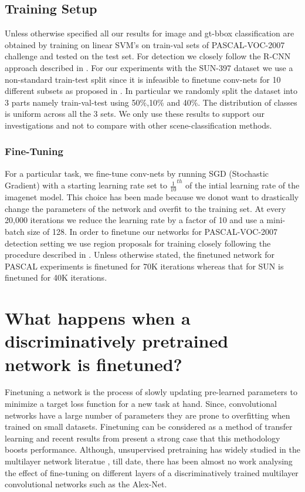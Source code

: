 \documentclass[runningheads]{llncs}
\begin{document}
\subsection{Training Setup} 
\label{sub:train-setup}
  Unless otherwise specified all our results for image and gt-bbox classification are obtained by training on linear SVM's on train-val sets of PASCAL-VOC-2007 \cite{Pascal} challenge and tested on the test set. For detection we closely follow the R-CNN approach described in \cite{Rcnn}. \newline
For our experiments with the SUN-397 \cite{sun} dataset we use a non-standard train-test split since it is infeasible to finetune conv-nets for 10 different subsets as proposed in \cite{sun}. In particular we randomly split the dataset into 3 parts namely train-val-test using 50\%,10\% and 40\%. The distribution of classes is uniform across all the 3 sets. We only use these results to support our investigations and not to compare with other scene-classification methods.  
 
\subsubsection{Fine-Tuning}
\label{sub:fine-train}
For a particular task, we fine-tune conv-nets by running SGD (Stochastic Gradient) with a starting learning rate set to $\frac{1}{10}^{th}$ of the intial learning rate of the imagenet model. This choice has been made because we donot want to drastically change the parameters of the network and overfit to the training set. At every 20,000 iterations we reduce the learning rate by a factor of 10 and use a mini-batch size of 128. In order to finetune our networks for PASCAL-VOC-2007 detection setting we use region proposals for training closely following the procedure described in \cite{Rcnn}. Unless otherwise stated, the finetuned network for PASCAL experiments is finetuned for 70K iterations whereas that for SUN is finetuned for 40K iterations.

\section{What happens when a discriminatively pretrained network is finetuned?}
\label{sec:fine}
Finetuning a network is the process of slowly updating pre-learned parameters to minimize a target loss function for a new task at hand. Since, convolutional networks have a large number of parameters they are prone to overfitting when trained on small datasets. Finetuning can be considered as a method of transfer learning and recent results from \cite{Rcnn}\cite{Decaf} present a strong case that this methodology boosts performance. Although, unsupervised pretraining has widely studied in the multilayer network literatue \cite{HintonPre}\cite{DeepPre}, till date, there has been almost no work analysing the effect of fine-tuning on different layers of a discriminatively trained multilayer convolutional networks such as the Alex-Net.
\end{document}
